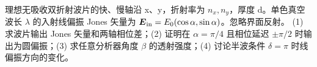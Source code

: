 理想无吸收双折射波片的快、慢轴沿 x、y，折射率为 \(n_x,n_y\)，厚度 d。单色真空波长 \(\lambda \) 的入射线偏振 Jones 矢量为 \(\boldsymbol E_{\rm in}=E_0(\cos\alpha,\sin\alpha)\)。忽略界面反射。
(1) 求波片输出 Jones 矢量和两轴相位差；(2) 证明在 \(\alpha =\pi /4\) 且相位延迟 \(\pm \pi /2\) 时输出为圆偏振；(3) 求任意分析器角度 \(\beta \) 的透射强度；(4) 讨论半波条件 \(\delta =\pi \) 时线偏振方向的变化。
